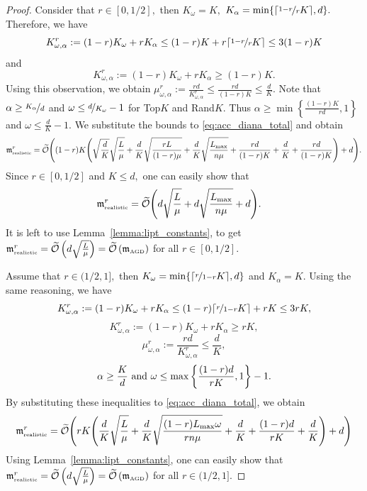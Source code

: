 \documentclass{article} %
\newcommand{\cO}{\mathcal{O}}
\theoremstyle{plain}
\theoremstyle{definition}
\theoremstyle{remark}
\newcommand{\eqdef}{:=}
\begin{document}
\THEOREMBETTERAGD*

\begin{proof}
  Consider that $r \in [0, 1/2],$ then $K_{\omega} = K,$ $K_{\alpha} = \min\{\lceil\nicefrac{1 - r}{r} K\rceil, d\}.$ Therefore, we have $$K_{\omega, \alpha}^r \eqdef (1 - r)K_{\omega} + r K_{\alpha} \leq (1 - r)K + r \lceil\nicefrac{1 - r}{r} K\rceil \leq 3 (1 - r) K$$ and 
  $$K_{\omega, \alpha}^r \eqdef (1 - r)K_{\omega} + r K_{\alpha} \geq (1 - r)K.$$
  Using this observation, we obtain
  $\mu^r_{\omega, \alpha} \eqdef \frac{rd}{K_{\omega, \alpha}^r} \leq \frac{rd}{(1 - r) K} \leq \frac{d}{K}.$ Note that $\alpha \geq \nicefrac{K_{\alpha}}{d}$ and $\omega \leq \nicefrac{d}{K_{\omega}} - 1$ for Top$K$ and Rand$K$.
  Thus $\alpha \geq \min\left\{\frac{(1 - r) K}{r d}, 1\right\}$ and $\omega \leq \frac{d}{K} - 1.$ We substitute the bounds to \eqref{eq:acc_diana_total} and obtain
  \begin{align*}
    \mathfrak{m}^{r}_{{\scriptscriptstyle \textnormal{realistic}}} = \widetilde{\cO}\Bigg((1 - r) K \Bigg(\sqrt{\frac{d}{K}}\sqrt{\frac{L}{\mu}} + \frac{d}{K}\sqrt{\frac{r L}{(1 - r)\mu}} + \frac{d}{K}\sqrt{\frac{L_{\max}}{n \mu}} + \frac{r d}{(1 - r) K} + \frac{d}{K} + \frac{rd}{(1 - r) K}\Bigg) + d\Bigg).
  \end{align*}
  Since $r \in [0, 1/2]$ and $K \leq d,$ one can easily show that
  \begin{align*}
    \mathfrak{m}^{r}_{{\scriptscriptstyle \textnormal{realistic}}} = \widetilde{\cO}\Bigg(&d \sqrt{\frac{L}{\mu}} + d \sqrt{\frac{L_{\max}}{n \mu}} + d\Bigg).
  \end{align*}
  It is left to use Lemma~\ref{lemma:lipt_constants}, to get $\mathfrak{m}^{r}_{{\scriptscriptstyle \textnormal{realistic}}} = \widetilde{\cO}\left(d \sqrt{\frac{L}{\mu}}\right) = \widetilde{\cO}\left(\mathfrak{m}_{{\scriptscriptstyle \textnormal{AGD}}}\right)$ for all $r \in [0, 1/2].$
  
  Assume that $r \in (1/2, 1],$ then $K_{\omega} = \min\{\lceil\nicefrac{r}{1 - r} K \rceil, d\}$ and $K_{\alpha} = K.$ Using the same reasoning, we have 
  $$K_{\omega, \alpha}^r \eqdef (1 - r)K_{\omega} + r K_{\alpha} \leq (1 - r) \lceil\nicefrac{r}{1 - r} K \rceil + r K \leq 3 r K,$$
  $$K_{\omega, \alpha}^r \eqdef (1 - r)K_{\omega} + r K_{\alpha} \geq r K,$$
  $$\mu^r_{\omega, \alpha} \eqdef \frac{rd}{K_{\omega, \alpha}^r} \leq \frac{d}{K},$$
  $$\alpha \geq \frac{K}{d} \textnormal{ and } \omega \leq \max\left\{\frac{(1 - r) d}{r K}, 1\right\} - 1.$$ By substituting these inequalities to \eqref{eq:acc_diana_total}, we obtain
  \begin{align*}
    \mathfrak{m}^{r}_{{\scriptscriptstyle \textnormal{realistic}}} = \widetilde{\cO}\Bigg(r K \Bigg(\frac{d}{K}\sqrt{\frac{L}{\mu}} + \frac{d}{K}\sqrt{\frac{(1 - r) L_{\max} \omega}{r n \mu}} + \frac{d}{K} + \frac{(1 - r)d}{r K} + \frac{d}{K}\Bigg) + d\Bigg)
  \end{align*}
  Using Lemma~\ref{lemma:lipt_constants}, one can easily show that $\mathfrak{m}^{r}_{{\scriptscriptstyle \textnormal{realistic}}} = \widetilde{\cO}\left(d \sqrt{\frac{L}{\mu}}\right) = \widetilde{\cO}\left(\mathfrak{m}_{{\scriptscriptstyle \textnormal{AGD}}}\right)$ for all $r \in (1/2, 1].$
  \end{proof}
\end{document}
